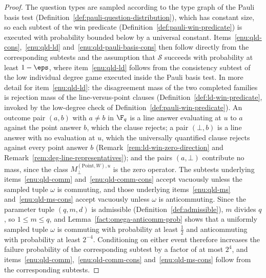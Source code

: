\begin{proof}
	\leanok
	The question types are sampled according to the type graph of the Pauli
	basis test (Definition~\ref{def:pauli-question-distribution}), which has
	constant size, so each subtest of the win predicate
	(Definition~\ref{def:pauli-win-predicate}) is executed with probability
	bounded below by a universal constant.
	Items~\ref{enu:qld-cons},~\ref{enu:qld-ld}
	and~\ref{enu:qld-pauli-basis-cons} then follow directly from the
	corresponding subtests and the assumption that $\mathcal{S}$ succeeds
	with probability at least $1-\eps$, where item~\ref{enu:qld-ld} follows
	from the consistency subtest of the low individual degree game executed
	inside the Pauli basis test. In more detail for item~\ref{enu:qld-ld}:
	the disagreement mass of the two completed families is rejection mass
	of the line-versus-point clauses
	(Definition~\ref{def:ld-win-predicate}, invoked by the low-degree
	check of Definition~\ref{def:pauli-win-predicate}). An outcome pair
	$(a,b)$ with $a \neq b$ in $\F_q$ is a line answer evaluating at $u$
	to $a$ against the point answer $b$, which the clause rejects; a pair
	$(\bot,b)$ is a line answer with no evaluation at $u$, which the
	universally quantified clause rejects against every point answer $b$
	(Remark~\ref{rem:ld-win-zero-direction} and
	Remark~\ref{rem:deg-line-representatives}); and the pairs $(a,\bot)$
	contribute no mass, since the class
	$M^{(\mathrm{Point},W),u}_{\bot}$ is the zero operator. The subtests underlying
	items~\ref{enu:qld-comm} and~\ref{enu:qld-comm-cons} accept vacuously
	unless the sampled tuple $\omega$ is commuting, and those underlying
	items~\ref{enu:qld-ms} and~\ref{enu:qld-ms-cons} accept vacuously
	unless $\omega$ is anticommuting. Since the parameter tuple $(q,m,d)$
	is admissible (Definition~\ref{def:admissible}), $m$ divides $q$, so
	$1 \leq m \leq q$, and Lemma~\ref{fact:omega-anticomm-prob} shows that
	a uniformly sampled tuple $\omega$ is commuting with probability at
	least $\frac12$ and anticommuting with probability at least $2^{-4}$.
	Conditioning on either event therefore increases the failure
	probability of the corresponding subtest by a factor of at most $2^4$,
	and items~\ref{enu:qld-comm},~\ref{enu:qld-comm-cons}
	and~\ref{enu:qld-ms-cons} follow from the corresponding subtests.

\end{proof}
